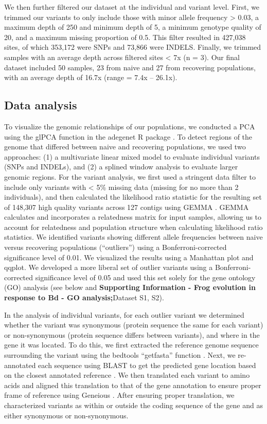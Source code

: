 \documentclass[9pt,twocolumn,twoside,lineno]{pnas-new}
\begin{document}
{We then further filtered our dataset at the individual and variant
level. First, we trimmed our variants to only include those with minor
allele frequency \textgreater{} 0.03, a maximum depth of 250 and minimum
depth of 5, a minimum genotype quality of 20, and a maximum missing
proportion of 0.5. This filter resulted in 427,038 sites, of which
353,172 were SNPs and 73,866 were INDELS. Finally, we trimmed samples
with an average depth across filtered sites \textless{} 7x (n = 3). Our
final dataset included 50 samples, 23 from naive and 27 from recovering
populations, with an average depth of 16.7x (range = 7.4x -- 26.1x).

\hypertarget{data-analysis}{%
\subsection*{Data analysis}\label{data-analysis}}

To visualize the genomic relationships of our populations, we conducted
a PCA using the glPCA function in the adegenet R package
\citep{jombart2008}. To detect regions of the genome that differed
between naive and recovering populations, we used two approaches: (1) a
multivariate linear mixed model to evaluate individual variants (SNPs
and INDELs), and (2) a splined window analysis to evaluate larger
genomic regions. For the variant analysis, we first used a stringent
data filter to include only variants with \textless{} 5\% missing data
(missing for no more than 2 individuals), and then calculated the
likelihood ratio statistic for the resulting set of 148,307 high quality
variants across 127 contigs using GEMMA \citep{zhou2014}. GEMMA
calculates and incorporates a relatedness matrix for input samples,
allowing us to account for relatedness and population structure when
calculating likelihood ratio statistics. We identified variants showing
different allele frequencies between naive versus recovering populations
(``outliers'') using a Bonferroni-corrected significance level of 0.01.
We visualized the results using a Manhattan plot and qqplot. We
developed a more liberal set of outlier variants using a
Bonferroni-corrected significance level of 0.05 and used this set solely
for the gene ontology (GO) analysis (see below and \textbf{Supporting
Information - Frog evolution in response to Bd - GO analysis;}Dataset
S1, S2).

In the analysis of individual variants, for each outlier variant we
determined whether the variant was synonymous (protein sequence the same
for each variant) or non-synonymous (protein sequence differs between
variants), and where in the gene it was located. To do this, we first
extracted the reference genome sequence surrounding the variant using
the bedtools ``getfasta'' function \citep{quinlan2010}. Next, we
re-annotated each sequence using BLAST to get the predicted gene
location based on the closest annotated reference \citep{altschul1997}.
We then translated each variant to amino acids and aligned this
translation to that of the gene annotation to ensure proper frame of
reference using Geneious \citep{kearse2012}. After ensuring proper
translation, we characterized variants as within or outside the coding
sequence of the gene and as either synonymous or non-synonymous.

}
\end{document}
